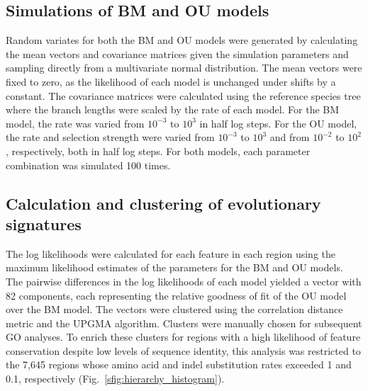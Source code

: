 \subsection{Simulations of BM and OU models}
Random variates for both the BM and OU models were generated by calculating the mean vectors and covariance matrices given the simulation parameters and sampling directly from a multivariate normal distribution. The mean vectors were fixed to zero, as the likelihood of each model is unchanged under shifts by a constant. The covariance matrices were calculated using the reference species tree where the branch lengths were scaled by the rate of each model. For the BM model, the rate was varied from $10^{-3}$ to $10^3$ in half log steps. For the OU model, the rate and selection strength were varied from $10^{-3}$ to $10^3$ and from $10^{-2}$ to $10^2$, respectively, both in half log steps. For both models, each parameter combination was simulated 100 times.

\subsection{Calculation and clustering of evolutionary signatures}
The log likelihoods were calculated for each feature in each region using the maximum likelihood estimates of the parameters for the BM and OU models. The pairwise differences in the log likelihoods of each model yielded a vector with 82 components, each representing the relative goodness of fit of the OU model over the BM model. The vectors were clustered using the correlation distance metric and the UPGMA algorithm. Clusters were manually chosen for subsequent GO analyses. To enrich these clusters for regions with a high likelihood of feature conservation despite low levels of sequence identity, this analysis was restricted to the 7,645 regions whose amino acid and indel substitution rates exceeded 1 and 0.1, respectively (Fig.~\ref{sfig:hierarchy_histogram}).

